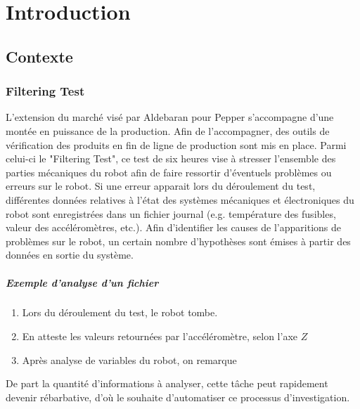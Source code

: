 \chapter{Introduction}
\label{Introduction}
\thispagestyle{fancy}

\section{Contexte}
\label{Introduction:Contexte}

\subsection{Filtering Test}
\label{Introduction:Contexte:Filtering Test}
L'extension du marché visé par Aldebaran pour Pepper s'accompagne d'une montée en puissance de la production. Afin de l'accompagner, des outils de vérification des produits en fin de ligne de production sont mis en place. Parmi celui-ci le "Filtering Test", ce test de six heures vise à stresser l'ensemble des parties mécaniques du robot afin de faire ressortir d'éventuels problèmes ou erreurs sur le robot. Si une erreur apparait lors du déroulement du test, différentes données relatives à l'état des systèmes mécaniques et électroniques du robot sont enregistrées dans un fichier journal (e.g. température des fusibles, valeur des accéléromètres, etc.). Afin d'identifier les causes de l'apparitions de problèmes sur le robot, un certain nombre d'hypothèses sont émises à partir des données en sortie du système. 

\paragraph{Exemple d'analyse d'un fichier}
\begin{enumerate}
	\item Lors du déroulement du test, le robot tombe.
	\item En atteste les valeurs retournées par l'accéléromètre, selon l'axe $Z$
	\item Après analyse de variables  du robot, on remarque 
\end{enumerate}


De part la quantité d'informations à analyser, cette tâche peut rapidement devenir rébarbative, d'où le souhaite d'automatiser ce processus d'investigation.
